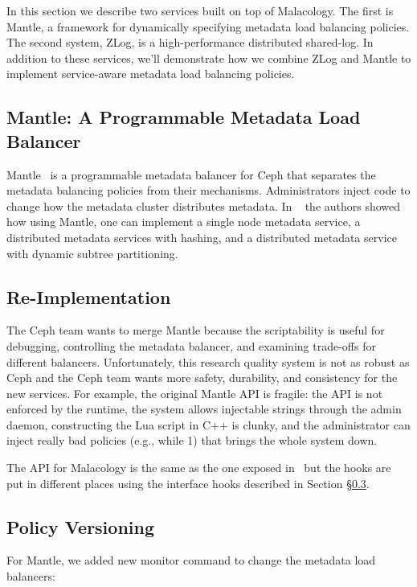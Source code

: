 \documentclass[10pt,twocolumn]{article}
\begin{document}
In this section we describe two services built on top of Malacology. The first
is Mantle, a framework for dynamically specifying metadata load balancing
policies. The second system, ZLog, is a high-performance distributed shared-log.
In addition to these services, we'll demonstrate how we combine ZLog and Mantle
to implement service-aware metadata load balancing policies.

\subsection{Mantle: A Programmable Metadata Load Balancer}
\label{sec:mantle}

Mantle~\cite{sevilla:sc15-mantle} is a programmable metadata
balancer for Ceph that separates the metadata balancing policies from their
mechanisms. Administrators inject code to change how the metadata cluster
distributes metadata. In ~\cite{sevilla:sc15-mantle} the authors showed how 
using Mantle, one can implement a single node metadata service, a distributed 
metadata services with hashing, and a distributed metadata service with dynamic 
subtree partitioning.

\subsection{Re-Implementation}

The Ceph team wants to merge Mantle because the scriptability is useful
for debugging, controlling the metadata balancer, and examining
trade-offs for different balancers. Unfortunately, this research quality
system is not as robust as Ceph and the Ceph team wants more safety,
durability, and consistency for the new services. For example, the
original Mantle API is fragile: the API is not enforced by the runtime,
the system allows injectable strings through the admin daemon,
constructing the Lua script in C++ is clunky, and the administrator can
inject really bad policies (e.g., while 1) that brings the whole system
down.

The API for Malacology is the same as the one exposed in~\cite{sevilla:sc15-mantle} but the hooks are put in different places using the interface hooks described in Section \S\ref{}.

\subsection{Policy Versioning}

For Mantle, we added new monitor command to change the metadata load balancers:
\end{document}
